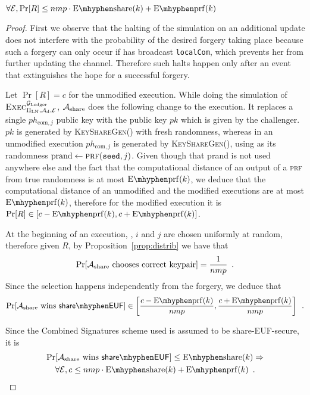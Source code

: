   \begin{proposition}
  \label{prop:forgery:share}
    $\forall \environment, \Pr[R] \leq nmp \cdot \mathrm{E \mhyphen share}(k) +
    \mathrm{E \mhyphen prf}(k)$
  \end{proposition}

  \begin{proof}
    First we observe that the halting of the simulation on an additional update
    does not interfere with the probability of the desired forgery taking place
    because such a forgery can only occur if \alice{} has broadcast
    \texttt{localCom}, which prevents her from further updating the channel.
    Therefore such halts happen only after an event that extinguishes the hope
    for a successful forgery.

    Let $\Pr[R] = c$ for the unmodified execution. While doing the simulation of
    $\textsc{Exec}^{\mathcal{G}_{\mathrm{Ledger}}}_{\Pi_{\mathrm{LN}}, \mathcal{A}_{\mathrm{d}},
    \mathcal{E}}$, $\mathcal{A}_{\mathrm{share}}$ does the following change to
    the execution. It replaces a single $ph_{\mathrm{com}, j}$ public key with
    the public key $pk$ which is given by the challenger. $pk$ is generated by
    \textsc{KeyShareGen}() with fresh randomness, whereas in an unmodified
    execution $ph_{\mathrm{com}, j}$ is generated by \textsc{KeyShareGen}(),
    using as its randomness $\mathrm{prand} \gets \textsc{prf}(\mathtt{seed},
    j)$. Given though that prand is not used anywhere else and the fact that the
    computational distance of an output of a \textsc{prf} from true randomness
    is at most $\mathrm{E \mhyphen prf}(k)$, we deduce that the computational
    distance of an unmodified and the modified executions are at most
    $\mathrm{E \mhyphen prf}(k)$, therefore for the modified execution it is
    $\Pr[R] \in [c - \mathrm{E \mhyphen prf}(k), c + \mathrm{E \mhyphen
    prf}(k)]$.

    At the beginning of an execution, \alice, $i$ and $j$ are chosen uniformly
    at random, therefore given $R$, by Proposition~\ref{prop:distrib} we have
    that
    \begin{equation*}
      \Pr[\mathcal{A}_{\mathrm{share}} \text{ chooses correct keypair}] =
      \frac{1}{nmp} \enspace.
    \end{equation*}
    Since the selection happens independently from the forgery, we deduce that
    \begin{equation*}
      \Pr[\adversary_{\mathrm{share}} \text{ wins } \mathsf{share \mhyphen EUF}]
      \in \left[\frac{c - \mathrm{E \mhyphen prf}(k)}{nmp}, \frac{c + \mathrm{E
      \mhyphen prf}(k)}{nmp}\right] \enspace.
    \end{equation*}

    Since the Combined Signatures scheme used is assumed to be
    \textsf{share-EUF}-secure, it is
    \begin{gather*}
      \Pr[\adversary_{\mathrm{share}} \text{ wins } \mathsf{share \mhyphen EUF}]
      \leq \mathrm{E \mhyphen share}(k) \Rightarrow \\
      \forall \environment, c \leq nmp \cdot \mathrm{E \mhyphen share}(k) +
      \mathrm{E \mhyphen prf}(k) \enspace.
    \end{gather*}
  \end{proof}

